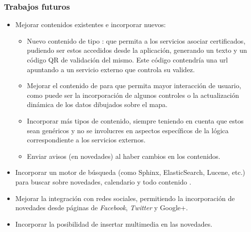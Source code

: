 
\subsubsection{Trabajos futuros}
\label{trabajos_futuros}

\begin{itemize}
\item Mejorar contenidos existentes e incorporar nuevos:
\begin{itemize}
\item Nuevo contenido de tipo : que permita a los servicios asociar certificados, pudiendo ser estos accedidos desde la aplicación, generando un texto y un código QR de validación del mismo. Este código contendría una \gls{url} apuntando a un servicio externo que controla su validez. 
\item Mejorar el contenido de  para que permita mayor interacción de usuario, como puede ser la incorporación de algunos controles o la actualización dinámica de los datos dibujados sobre el mapa.
\item Incorporar más tipos de contenido, siempre teniendo en cuenta que estos sean genéricos y no se involucres en aspectos específicos de la lógica correspondiente a los servicios externos.
\item Enviar avisos (en novedades) al haber cambios en los contenidos.
\end{itemize}
\item Incorporar un motor de búsqueda (como Sphinx, ElasticSearch, Lucene, etc.) para buscar sobre novedades, calendario y todo contenido .
\item Mejorar la integración con redes sociales, permitiendo la incorporación de novedades desde páginas de \textit{Facebook}, \textit{Twitter} y Google+.
\item Incorporar la posibilidad de insertar multimedia en las novedades.
\end{itemize}